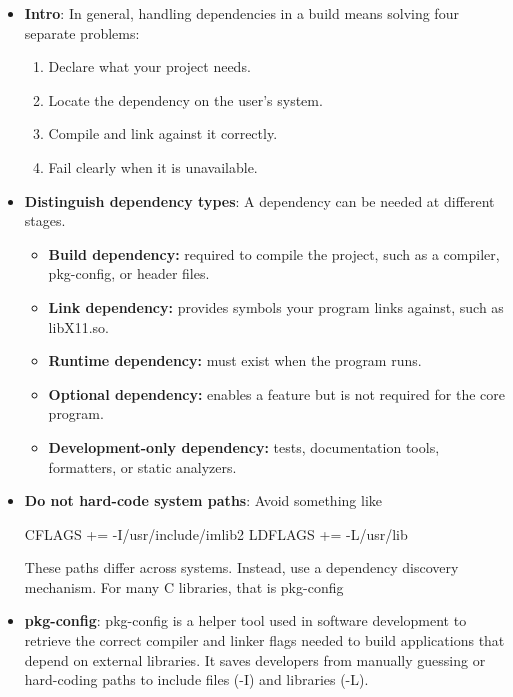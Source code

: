\documentclass{report}
\begin{document}
    \pagebreak 
    \begin{itemize}
        \item \textbf{Intro}: In general, handling dependencies in a build means solving four separate problems:
            \begin{enumerate}
                \item Declare what your project needs.
                \item Locate the dependency on the user’s system.
                \item Compile and link against it correctly.
                \item Fail clearly when it is unavailable.
            \end{enumerate}
        \item \textbf{Distinguish dependency types}: A dependency can be needed at different stages.
            \begin{itemize}
                \item \textbf{Build dependency:} required to compile the project, such as a compiler, pkg-config, or header files.
                \item \textbf{Link dependency:} provides symbols your program links against, such as libX11.so.
                \item \textbf{Runtime dependency:} must exist when the program runs.
                \item \textbf{Optional dependency:} enables a feature but is not required for the core program.
                \item \textbf{Development-only dependency:} tests, documentation tools, formatters, or static analyzers.
            \end{itemize}
        \item \textbf{Do not hard-code system paths}: Avoid something like
            \bigbreak \noindent 
            \begin{cppcode}
                CFLAGS += -I/usr/include/imlib2
                LDFLAGS += -L/usr/lib
            \end{cppcode}
            \bigbreak \noindent 
            These paths differ across systems. Instead, use a dependency discovery mechanism. For many C libraries, that is pkg-config
        \item \textbf{pkg-config}: pkg-config is a helper tool used in software development to retrieve the correct compiler and linker flags needed to build applications that depend on external libraries. It saves developers from manually guessing or hard-coding paths to include files (-I) and libraries (-L).

\end{itemize}
\end{document}
